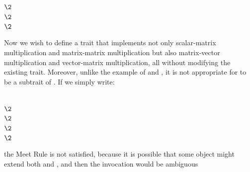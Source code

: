 \begin{codeexamplesize}
\begin{tabbing}
 \\
\(\2\) \\
\(\2\) \\
\(\2\) \\
\end{tabbing}
\end{codeexamplesize}
Now we wish to define a  trait that implements not only
scalar-matrix multiplication and
matrix-matrix multiplication but also matrix-vector multiplication and vector-matrix multiplication,
all without modifying the existing  trait.  Moreover,
unlike the example of  and , it is not
appropriate for  to be a subtrait of .
If we simply write:
\begin{codeexamplesize}
\begin{tabbing}
 \\
\(\2\) \\
\(\2\) \\
\(\2\) \\
\(\2\) \\
\end{tabbing}
\end{codeexamplesize}
the Meet Rule is not satisfied, because it is possible that some object  might extend
both  and , and then the invocation  would be ambiguous
